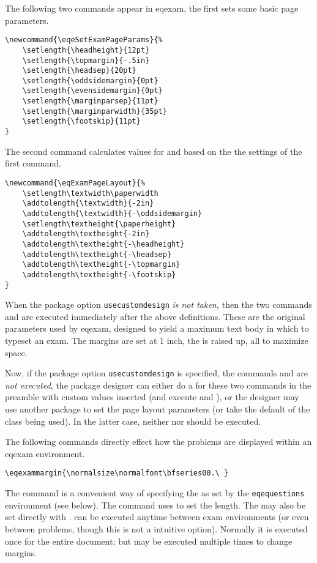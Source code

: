 \documentclass{article}
\begin{document}
The following two commands appear in \textsf{eqexam}, the first sets some basic
page parameters.
\begin{Verbatim}[xleftmargin=\leftmargini,fontsize=\fontsize{9}{11}\selectfont]
\newcommand{\eqeSetExamPageParams}{%
    \setlength{\headheight}{12pt}
    \setlength{\topmargin}{-.5in}
    \setlength{\headsep}{20pt}
    \setlength{\oddsidemargin}{0pt}
    \setlength{\evensidemargin}{0pt}
    \setlength{\marginparsep}{11pt}
    \setlength{\marginparwidth}{35pt}
    \setlength{\footskip}{11pt}
}
\end{Verbatim}
The second command calculates values for  and 
based on the the settings of the first command.
\begin{Verbatim}[xleftmargin=\leftmargini,fontsize=\fontsize{9}{11}\selectfont]
\newcommand{\eqExamPageLayout}{%
    \setlength\textwidth\paperwidth
    \addtolength{\textwidth}{-2in}
    \addtolength{\textwidth}{-\oddsidemargin}
    \setlength\textheight{\paperheight}
    \addtolength\textheight{-2in}
    \addtolength\textheight{-\headheight}
    \addtolength\textheight{-\headsep}
    \addtolength\textheight{-\topmargin}
    \addtolength\textheight{-\footskip}
}
\end{Verbatim}
When the package option \texttt{usecustomdesign} \textit{is not taken,}
then the two commands  and 
are executed immediately after the above definitions. These are the
original parameters used by \textsf{eqexam}, designed to yield a maximum
text body in which to typeset an exam. The margins are set at 1 inch, the
 is raised up, all to maximize space.

Now, if the package option \texttt{usecustomdesign} is specified, the
commands  and  are \emph{not
executed}, the package designer can either do a  for
these two commands in the preamble with custom values inserted (and
execute  and ), or the
designer may use another package to set the page layout parameters (or
take the default of the class being used). In the latter case,
neither  nor  should be executed.

\newtopic The following commands directly effect how the problems are
displayed within an \textsf{eqexam} environment.

\begin{Verbatim}[xleftmargin=\leftmargini,fontsize=\fontsize{9}{11}\selectfont]
\eqexammargin{\normalsize\normalfont\bfseries00.\ }
\end{Verbatim}
The command  is a convenient way of specifying the
 as set by the \texttt{eqequestions} environment (see
below). The command uses  to set the  length.
The  may also be set directly with .
 can be executed anytime between exam environments (or
even between problems, though this is not a intuitive option). Normally it
is executed once for the entire document; but may be executed multiple
times to change margins.
\end{document}
